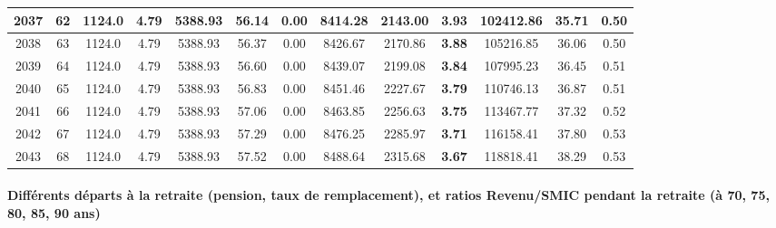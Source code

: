 {\begin{center}
\begin{tabular}[htb]{|c|c||c|c|c|c|c|c||c|c||c|c|c||}
\hline 
 2037 &  62 &  1124.0 &  4.79 &  5388.93 &  56.14 &  0.00 &  8414.28 &  2143.00 &  {\bf 3.93} &  102412.86 &  35.71 &  0.50 \\ 
\hline 
 2038 &  63 &  1124.0 &  4.79 &  5388.93 &  56.37 &  0.00 &  8426.67 &  2170.86 &  {\bf 3.88} &  105216.85 &  36.06 &  0.50 \\ 
\hline 
 2039 &  64 &  1124.0 &  4.79 &  5388.93 &  56.60 &  0.00 &  8439.07 &  2199.08 &  {\bf 3.84} &  107995.23 &  36.45 &  0.51 \\ 
\hline 
 2040 &  65 &  1124.0 &  4.79 &  5388.93 &  56.83 &  0.00 &  8451.46 &  2227.67 &  {\bf 3.79} &  110746.13 &  36.87 &  0.51 \\ 
\hline 
 2041 &  66 &  1124.0 &  4.79 &  5388.93 &  57.06 &  0.00 &  8463.85 &  2256.63 &  {\bf 3.75} &  113467.77 &  37.32 &  0.52 \\ 
\hline 
 2042 &  67 &  1124.0 &  4.79 &  5388.93 &  57.29 &  0.00 &  8476.25 &  2285.97 &  {\bf 3.71} &  116158.41 &  37.80 &  0.53 \\ 
\hline 
 2043 &  68 &  1124.0 &  4.79 &  5388.93 &  57.52 &  0.00 &  8488.64 &  2315.68 &  {\bf 3.67} &  118818.41 &  38.29 &  0.53 \\ 
\hline 
\hline 
\end{tabular} 
\end{center} } 
\newpage 
 
\paragraph{Différents départs à la retraite (pension, taux de remplacement), et ratios Revenu/SMIC pendant la retraite (à 70, 75, 80, 85, 90 ans)} 

